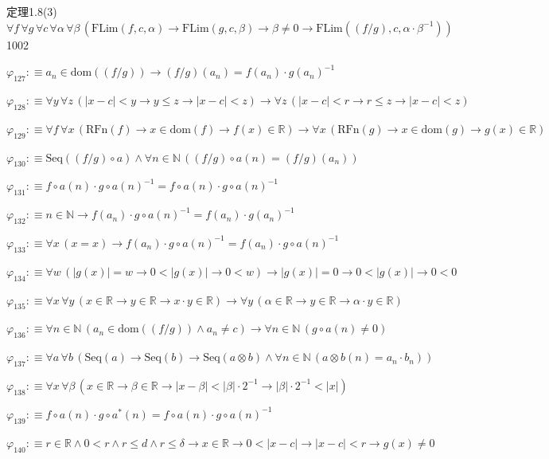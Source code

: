 \begin{fullproof}{定理1.8(3)}{$\forall f\,\forall g\,\forall c\,\forall \alpha\,\forall \beta\,(\mathrm{FLim}(f,c,\alpha) \to \mathrm{FLim}(g,c,\beta) \to \beta \neq 0 \to \mathrm{FLim}((f / g),c,\alpha \cdot \beta^{-1}))$}{1002}
\begin{abbrevlist}
\item $\varphi_{127} :\equiv a_{n} \in \mathrm{dom}((f / g)) \to (f / g)(a_{n}) = f(a_{n}) \cdot g(a_{n})^{-1}$
\item $\varphi_{128} :\equiv \forall y\,\forall z\,(\lvert x - c \rvert < y \to y \leq z \to \lvert x - c \rvert < z) \to \forall z\,(\lvert x - c \rvert < r \to r \leq z \to \lvert x - c \rvert < z)$
\item $\varphi_{129} :\equiv \forall f\,\forall x\,(\mathrm{RFn}(f) \to x \in \mathrm{dom}(f) \to f(x) \in \mathbb{R}) \to \forall x\,(\mathrm{RFn}(g) \to x \in \mathrm{dom}(g) \to g(x) \in \mathbb{R})$
\item $\varphi_{130} :\equiv \mathrm{Seq}((f / g) \circ a) \land \forall n \in \mathbb{N}\,((f / g) \circ a(n) = (f / g)(a_{n}))$
\item $\varphi_{131} :\equiv f \circ a(n) \cdot g \circ a(n)^{-1} = f \circ a(n) \cdot g \circ a(n)^{-1}$
\item $\varphi_{132} :\equiv n \in \mathbb{N} \to f(a_{n}) \cdot g \circ a(n)^{-1} = f(a_{n}) \cdot g(a_{n})^{-1}$
\item $\varphi_{133} :\equiv \forall x\,(x = x) \to f(a_{n}) \cdot g \circ a(n)^{-1} = f(a_{n}) \cdot g \circ a(n)^{-1}$
\item $\varphi_{134} :\equiv \forall w\,(\lvert g(x) \rvert = w \to 0 < \lvert g(x) \rvert \to 0 < w) \to \lvert g(x) \rvert = 0 \to 0 < \lvert g(x) \rvert \to 0 < 0$
\item $\varphi_{135} :\equiv \forall x\,\forall y\,(x \in \mathbb{R} \to y \in \mathbb{R} \to x \cdot y \in \mathbb{R}) \to \forall y\,(\alpha \in \mathbb{R} \to y \in \mathbb{R} \to \alpha \cdot y \in \mathbb{R})$
\item $\varphi_{136} :\equiv \forall n \in \mathbb{N}\,(a_{n} \in \mathrm{dom}((f / g)) \land a_{n} \neq c) \to \forall n \in \mathbb{N}\,(g \circ a(n) \neq 0)$
\item $\varphi_{137} :\equiv \forall a\,\forall b\,(\mathrm{Seq}(a) \to \mathrm{Seq}(b) \to \mathrm{Seq}(a \otimes b) \land \forall n \in \mathbb{N}\,(a \otimes b(n) = a_{n} \cdot b_{n}))$
\item $\varphi_{138} :\equiv \forall x\,\forall \beta\,(x \in \mathbb{R} \to \beta \in \mathbb{R} \to \lvert x - \beta \rvert < \lvert \beta \rvert \cdot 2^{-1} \to \lvert \beta \rvert \cdot 2^{-1} < \lvert x \rvert)$
\item $\varphi_{139} :\equiv f \circ a(n) \cdot g \circ a^{\ast}(n) = f \circ a(n) \cdot g \circ a(n)^{-1}$
\item $\varphi_{140} :\equiv r \in \mathbb{R} \land 0 < r \land r \leq d \land r \leq \delta \to x \in \mathbb{R} \to 0 < \lvert x - c \rvert \to \lvert x - c \rvert < r \to g(x) \neq 0$

\end{abbrevlist}
\end{fullproof}
